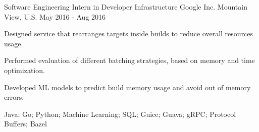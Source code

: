 \begin{cventries}
  \cventry
    {Software Engineering Intern in Developer Infrastructure} %
    {Google Inc.} %
    {Mountain View, U.S.} %
    {May 2016 - Aug 2016} %
    {
      \begin{cvitems} %
        \item {Designed service that rearranges targets inside builds to reduce overall resources usage.}
        \item {Performed evaluation of different batching strategies, based on memory and time optimization.}
        \item {Developed ML models to predict build memory usage and avoid out of memory errors.}
        \item {Java; Go; Python; Machine Learning; SQL; Guice; Guava; gRPC; Protocol Buffers; Bazel}
      \end{cvitems}
    }
\end{cventries}
